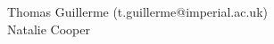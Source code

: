 \documentclass[12pt,letterpaper]{article}
\begin{document}

Thomas Guillerme (t.guillerme@imperial.ac.uk)\\ %
Natalie Cooper
\end{document}
